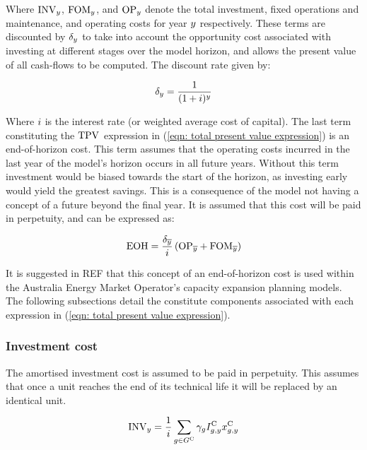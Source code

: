 \documentclass{article}
\begin{document}
Where $\cInvestmentCost$, $\cFixedOperationsMaintenanceCost$, and $\cOperatingCost[\iYear]$ denote the total investment, fixed operations and maintenance, and operating costs for year $\iYear$ respectively. These terms are discounted by $\cDiscountRate$ to take into account the opportunity cost associated with investing at different stages over the model horizon, and allows the present value of all cash-flows to be computed. The discount rate given by:

\begin{equation}
\cDiscountRate = \frac{1}{(1 + \cInterestRate)^{\iYear}}
\end{equation}

Where $\cInterestRate$ is the interest rate (or weighted average cost of capital). The last term constituting the $\cTotalPresentValue$ expression in (\ref{eqn: total present value expression}) is an end-of-horizon cost.
This term assumes that the operating costs incurred in the last year of the model's horizon occurs in all future years. Without this term investment would be biased towards the start of the horizon, as investing early would yield the greatest savings. This is a consequence of the model not having a concept of a future beyond the final year. It is assumed that this cost will be paid in perpetuity, and can be expressed as:

\begin{equation}
\cEndOfHorizonCost = \frac{\cDiscountRate[\iYearTerminal]}{\cInterestRate} 
\left(
\cOperatingCost[\iYearTerminal] 
+ 
\cFixedOperationsMaintenanceCost[\iYearTerminal] 
\right)
\end{equation}

It is suggested in REF that this concept of an end-of-horizon cost is used within the Australia Energy Market Operator's capacity expansion planning models. The following subsections detail the constitute components associated with each expression in (\ref{eqn: total present value expression}).

\subsubsection{Investment cost}
The amortised investment cost is assumed to be paid in perpetuity. This assumes that once a unit reaches the end of its technical life it will be replaced by an identical unit.

\begin{equation}
\cInvestmentCost = \frac{1}{\cInterestRate}\sum\limits_{g\in \sGeneratorsCandidate} \cAmortisationRate  \cCandidateInvestmentCost \vInstalledCapacity
\end{equation}
\end{document}
